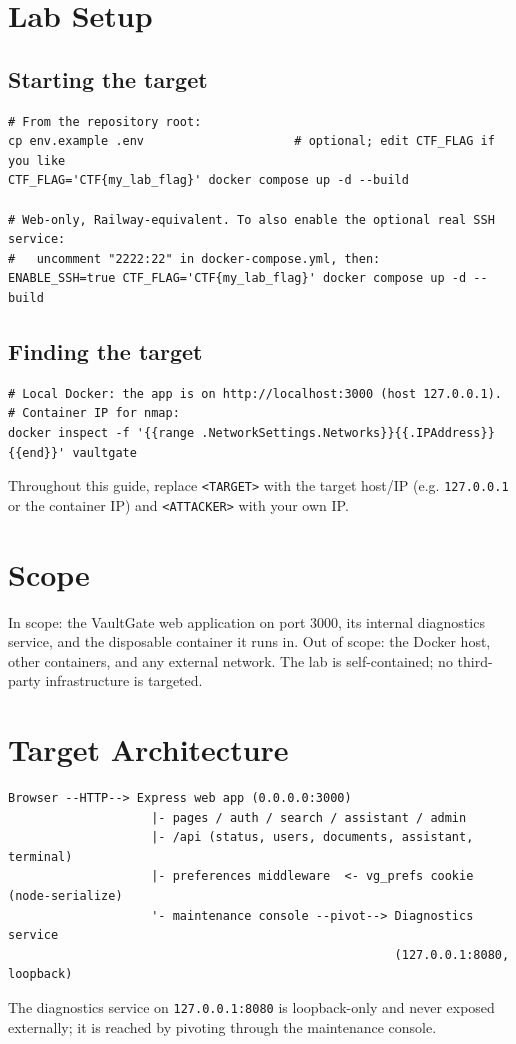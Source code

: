 \documentclass[11pt,a4paper]{article}
\begin{document}
\section{Lab Setup}
\subsection{Starting the target}
\begin{lstlisting}[style=bash]
# From the repository root:
cp env.example .env                     # optional; edit CTF_FLAG if you like
CTF_FLAG='CTF{my_lab_flag}' docker compose up -d --build

# Web-only, Railway-equivalent. To also enable the optional real SSH service:
#   uncomment "2222:22" in docker-compose.yml, then:
ENABLE_SSH=true CTF_FLAG='CTF{my_lab_flag}' docker compose up -d --build
\end{lstlisting}

\subsection{Finding the target}
\begin{lstlisting}[style=bash]
# Local Docker: the app is on http://localhost:3000 (host 127.0.0.1).
# Container IP for nmap:
docker inspect -f '{{range .NetworkSettings.Networks}}{{.IPAddress}}{{end}}' vaultgate
\end{lstlisting}
Throughout this guide, replace \texttt{<TARGET>} with the target host/IP (e.g.
\texttt{127.0.0.1} or the container IP) and \texttt{<ATTACKER>} with your own IP.

\section{Scope}
In scope: the VaultGate web application on port 3000, its internal diagnostics
service, and the disposable container it runs in. Out of scope: the Docker host,
other containers, and any external network. The lab is self-contained; no
third-party infrastructure is targeted.

\section{Target Architecture}
\begin{lstlisting}[style=plain]
Browser --HTTP--> Express web app (0.0.0.0:3000)
                    |- pages / auth / search / assistant / admin
                    |- /api (status, users, documents, assistant, terminal)
                    |- preferences middleware  <- vg_prefs cookie (node-serialize)
                    '- maintenance console --pivot--> Diagnostics service
                                                      (127.0.0.1:8080, loopback)
\end{lstlisting}
The diagnostics service on \texttt{127.0.0.1:8080} is loopback-only and never
exposed externally; it is reached by pivoting through the maintenance console.
\end{document}

